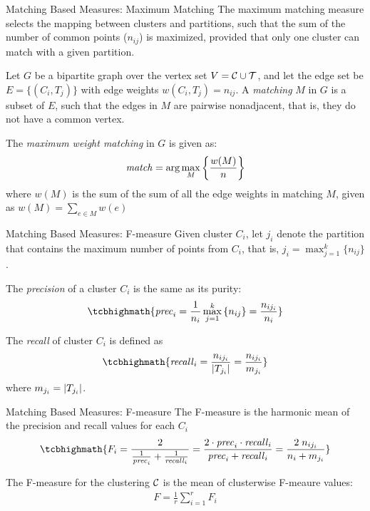 \begin{frame}{Matching Based Measures: Maximum Matching}
The maximum matching
measure selects the mapping between clusters and partitions, such
that the sum of the number of common points ($n_{ij}$) is
maximized, provided that only one cluster can match with a given
partition.

\medskip
Let $G$ be a bipartite graph over the vertex set $V = {\mathcal C} \cup {\mathcal T}$, and
let the edge set be $E = \{ (C_i, T_{j}) \}$ with 
edge weights $w(C_i,T_{j}) = n_{ij}$.
A {\em matching} $M$ in $G$ is a subset of $E$, such that the edges in
$M$ are pairwise nonadjacent, that is, they do not have a common vertex.

\medskip
The {\em maximum weight matching} in $G$ is given as:
\begin{align*}
  \mathit{match} = \arg \max_M \left\{ \frac{w(M)}{n} \right\}
\end{align*}
where $w(M)$ is the sum of the sum of
all the edge weights in matching $M$, given as $w(M) = \sum_{e \in M} w(e)$
\end{frame}




\begin{frame}{Matching Based Measures: F-measure}
  \small
Given cluster $C_i$, let $j_i$ denote the
partition that contains the maximum number of points from $C_i$,
that is, $j_i = \max_{j=1}^k \{ n_{ij} \}$.  

\medskip
The {\em precision} of a
cluster $C_i$ is the same as its purity:
\begin{align*}
\tcbhighmath{
  \mathit{prec}_i = \frac{1}{n_{i}}\max_{j=1}^k \left\{ n_{ij} \right\} =
  \frac{n_{ij_i}}{n_i}
}
\end{align*}

\medskip
The {\em recall} of cluster $C_i$ is def\/{i}ned as
\begin{align*}
\tcbhighmath{
  \mathit{recall}_i = \frac{n_{ij_i}}{\card{T_{j_i}}} =\frac{n_{ij_i}}{m_{j_i}}
}
 \end{align*}
 where $m_{j_i} = |T_{j_i}|$.

\medskip
\end{frame}

\begin{frame}{Matching Based Measures: F-measure}
The F-measure is the harmonic mean of the precision and recall values for
each $C_i$
\begin{align*}
\tcbhighmath{
  F_i = \frac{2}{\frac{1}{\mathit{prec}_i} + \frac{1}{\mathit{recall}_i}} =
  \frac{2 \cdot \mathit{prec}_i \cdot \mathit{recall}_i}{\mathit{prec}_i + \mathit{recall}_i} =
  \frac{2 \; n_{ij_i}}{n_{i} + m_{j_i}}
}
\end{align*}

\medskip
The F-measure for the clustering ${\mathcal C}$ is the mean of clusterwise
F-meaure values:
\begin{align*}
  F = \frac{1}{r} \sum_{i=1}^r F_i
\end{align*}
\end{frame}




